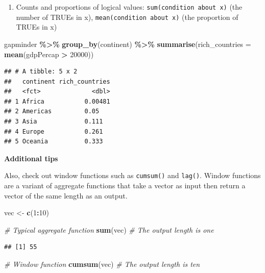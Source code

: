 \documentclass[
]{book}
\newenvironment{Shaded}{\begin{snugshade}}{\end{snugshade}}
\newcommand{\AttributeTok}[1]{\textcolor[rgb]{0.13,0.29,0.53}{#1}}
\newcommand{\CommentTok}[1]{\textcolor[rgb]{0.56,0.35,0.01}{\textit{#1}}}
\newcommand{\DecValTok}[1]{\textcolor[rgb]{0.00,0.00,0.81}{#1}}
\newcommand{\FunctionTok}[1]{\textcolor[rgb]{0.13,0.29,0.53}{\textbf{#1}}}
\newcommand{\NormalTok}[1]{#1}
\newcommand{\OtherTok}[1]{\textcolor[rgb]{0.56,0.35,0.01}{#1}}
\newcommand{\SpecialCharTok}[1]{\textcolor[rgb]{0.81,0.36,0.00}{\textbf{#1}}}
\providecommand{\tightlist}{%
  \setlength{\itemsep}{0pt}\setlength{\parskip}{0pt}}
\begin{document}
\begin{enumerate}
\def\labelenumi{\arabic{enumi}.}
\setcounter{enumi}{4}
\tightlist
\item
  Counts and proportions of logical values: \texttt{sum(condition\ about\ x)} (the number of TRUEs in x), \texttt{mean(condition\ about\ x)} (the proportion of TRUEs in x)
\end{enumerate}

\begin{Shaded}
\begin{Highlighting}[]
\NormalTok{gapminder }\SpecialCharTok{\%\textgreater{}\%}
  \FunctionTok{group\_by}\NormalTok{(continent) }\SpecialCharTok{\%\textgreater{}\%}
  \FunctionTok{summarise}\NormalTok{(}\AttributeTok{rich\_countries =} \FunctionTok{mean}\NormalTok{(gdpPercap }\SpecialCharTok{\textgreater{}} \DecValTok{20000}\NormalTok{))}
\end{Highlighting}
\end{Shaded}

\begin{verbatim}
## # A tibble: 5 x 2
##   continent rich_countries
##   <fct>              <dbl>
## 1 Africa           0.00481
## 2 Americas         0.05   
## 3 Asia             0.111  
## 4 Europe           0.261  
## 5 Oceania          0.333
\end{verbatim}

\textbf{Additional tips}

Also, check out window functions such as \texttt{cumsum()} and \texttt{lag()}. Window functions are a variant of aggregate functions that take a vector as input then return a vector of the same length as an output.

\begin{Shaded}
\begin{Highlighting}[]
\NormalTok{vec }\OtherTok{\textless{}{-}} \FunctionTok{c}\NormalTok{(}\DecValTok{1}\SpecialCharTok{:}\DecValTok{10}\NormalTok{)}

\CommentTok{\# Typical aggregate function}
\FunctionTok{sum}\NormalTok{(vec) }\CommentTok{\# The output length is one}
\end{Highlighting}
\end{Shaded}

\begin{verbatim}
## [1] 55
\end{verbatim}

\begin{Shaded}
\begin{Highlighting}[]
\CommentTok{\# Window function}
\FunctionTok{cumsum}\NormalTok{(vec) }\CommentTok{\# The output length is ten}
\end{Highlighting}
\end{Shaded}
\end{document}
